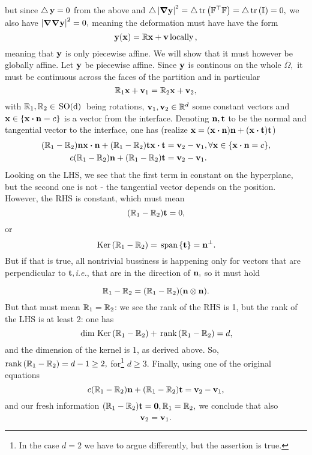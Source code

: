 \documentclass[11pt]{scrartcl} %
\begin{document}
but since $\operatorname{\bigtriangleup} \vb{y} = 0$ from the above and $\laplace \abs{\grad \vb{y}}^{2} = \laplace \trace\qty(\transpose{\fgrad}\fgrad) = \laplace \trace \qty(\identityM) = 0,$ we also have $\abs{\grad \grad \vb{y}}^{2} = 0,$ meaning the deformation must have have the form
\[
	\vb{y}(\vb{x}) = \mathbb{R}\vb{x}+\vb{v} \, \text{locally} \,,
\]
meaning that $\vb{y}$ is only piecewise affine. We will show that it must however be globally affine. Let $\vb{y}$ be piecewise affine. Since $\vb{y}$ is continous on the whole $\overline{\Omega},$ it must be continuous across the faces of the partition and in particular
\[
	\mathbb{R}_1 \vb{x} + \vb{v}_1 = \mathbb{R}_2 \vb{x} + \vb{v}_2,
\]
with $\mathbb{R}_1, \mathbb{R}_2 \in \, \text{SO(d)} \,$ being rotations, $\vb{v}_1, \vb{v}_2 \in {\mathbb R}^{d}$ some constant vectors and $\vb{x} \in \qty{\vb{x} \vdot \vb{n} = c}$ is a vector from the interface. Denoting $\vb{n}, \vb{t}$ to be the normal and tangential vector to the interface, one has (realize $\vb{x} = \qty(\vb{x} \vdot \vb{n}) \vb{n} + \qty(\vb{x} \vdot \vb{t})\vb{t}$)
\begin{align*}
	\qty(\tensorq{R}_1 - \tensorq{R}_2) \vb{n}  \vb{x} \vdot \vb{n} + \qty(\tensorq{R}_1 - \tensorq{R}_2) \vb{t} \vb{x} \vdot \vb{t} &= \vb{v}_2 - \vb{v}_1, \forall \vb{x} \in \qty{\vb{x} \vdot \vb{n} = c}, \\
	c \qty(\tensorq{R}_1 - \tensorq{R}_2)\vb{n} + \qty(\tensorq{R}_1 - \tensorq{R}_2)\vb{t} &= \vb{v}_2 - \vb{v}_1.
\end{align*}
Looking on the LHS, we see that the first term in constant on the hyperplane, but the second one is not - the tangential vector depends on the position. However, the RHS is constant, which must mean
\[
	\qty(\mathbb{R}_1 - \mathbb{R}_2)\vb{t} = 0,
\]
or
\[
	\, \text{Ker} \,\qty(\mathbb{R}_1 - \mathbb{R}_2) = \, \text{span} \,\qty{\vb{t}} = \vb{n}^{\perp}.
\]
But if that is true, all nontrivial bussiness is happening only for vectors that are perpendicular to $\vb{t},$\textit{i.e.}, that are in the direction of $\vb{n},$ so it must hold

\[
	\mathbb{R}_1 - \mathbb{R}_2 = \qty(\mathbb{R}_1 - \mathbb{R}_2)\qty(\vb{n} \otimes \vb{n}).
\]
But that must mean $\mathbb{R}_1 = \mathbb{R}_2$: we see the rank of the RHS is 1,  but the rank of the LHS is at least 2: one has
\[
	\, \text{dim Ker} \,\qty(\mathbb{R}_1 - \mathbb{R}_2) + \, \text{rank} \,\qty(\mathbb{R}_1 - \mathbb{R}_2) = d,
\]
and the dimension of the kernel is 1, as derived above. So, $\text{rank} \,\qty(\mathbb{R}_1 - \mathbb{R}_2) = d-1 \geq 2,$ for\footnote{In the case $d=2$ we have to argue differently, but the assertion is true.} $d \geq 3.$
Finally, using one of the original equations
\[
	c \qty(\mathbb{R}_1 - \mathbb{R}_2)\vb{n} + \qty(\mathbb{R}_1 - \mathbb{R}_2) \vb{t} = \vb{v}_2 - \vb{v}_1,
\]
and our fresh information $\qty(\mathbb{R}_1 - \mathbb{R}_2) \vb{t} = \vb{0}, \mathbb{R}_1 = \mathbb{R}_2,$ we conclude that also
\[
	\vb{v}_2 = \vb{v}_1.
\]
\end{document}
